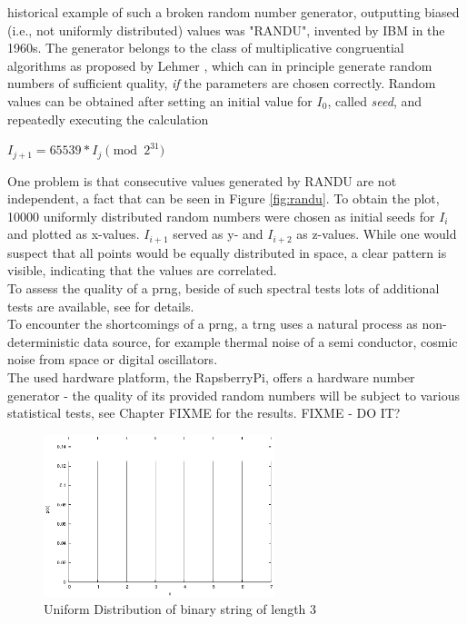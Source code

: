 historical example of such a broken random number generator, outputting biased (i.e., not uniformly distributed) values was "RANDU", invented by IBM in the
1960s. 
The generator belongs to the class of multiplicative congruential algorithms as proposed by Lehmer \cite{MR0044899}, which can in principle generate random
numbers of sufficient quality, \textit{if} the parameters are chosen correctly.
Random values can be obtained after setting an initial value for $I_0$, called \textit{seed}, and repeatedly executing the calculation
\begin{center}
 $I_{j+1} = 65539 * I_j \pmod{2^{31}}$
\end{center}
One problem 
is that consecutive values generated by RANDU are not independent, a fact that	 can be seen in Figure \ref{fig:randu}. To obtain the plot, 10000 uniformly distributed 
random numbers were chosen as initial seeds for $I_i$ and plotted as x-values. $I_{i+1}$ served as y- and $I_{i+2}$ as z-values. While one would suspect that all points
would be equally distributed in space, a clear pattern is visible, indicating that the values are correlated.
\\
To assess the quality of a \gls{prng}, beside of such spectral tests lots of additional tests are available, see \cite{nistRAND} for details.
\\
To encounter the shortcomings of a \gls{prng}, a \gls{trng} uses a natural process as non-deterministic data source, for example
thermal noise of a semi conductor, cosmic noise from space or digital oscillators.
\\
The used hardware platform, the RapsberryPi, offers a hardware number generator - the quality of its provided random numbers will be subject
to various statistical tests, see Chapter FIXME for the results. FIXME - DO IT?
\begin{figure}
    \centering
    \includegraphics[width=0.6\textwidth]{figures/uniform}
    \caption{Uniform Distribution of binary string of length 3}
    \label{fig:uniform}
\end{figure}
